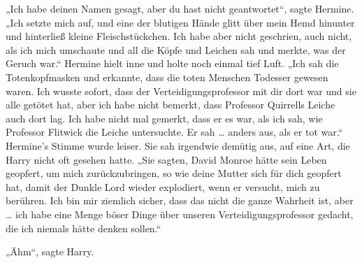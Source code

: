 „Ich habe deinen Namen gesagt, aber du hast nicht geantwortet“, sagte Hermine.
„Ich setzte mich auf, und eine der blutigen Hände glitt über mein Hemd hinunter und hinterließ kleine Fleischstückchen. Ich habe aber nicht geschrien, auch nicht, als ich mich umschaute und all die Köpfe und Leichen sah und merkte, was der Geruch war.“ Hermine hielt inne und holte noch einmal tief Luft.
„Ich sah die Totenkopfmasken und erkannte, dass die toten Menschen Todesser gewesen waren. Ich wusste sofort, dass der Verteidigungsprofessor mit dir dort war und sie alle getötet hat, aber ich habe nicht bemerkt, dass Professor Quirrells Leiche auch dort lag. Ich habe nicht mal gemerkt, dass er es war, als ich sah, wie Professor Flitwick die Leiche untersuchte. Er sah … anders aus, als er tot war.“
Hermine’s Stimme wurde leiser. Sie sah irgendwie demütig aus, auf eine Art, die Harry nicht oft gesehen hatte.
„Sie sagten, David Monroe hätte sein Leben geopfert, um mich zurückzubringen, so wie deine Mutter sich für dich geopfert hat, damit der Dunkle Lord wieder explodiert, wenn er versucht, mich zu berühren. Ich bin mir ziemlich sicher, dass das nicht die ganze Wahrheit ist, aber … ich habe eine Menge böser Dinge über unseren Verteidigungsprofessor gedacht, die ich niemals hätte denken sollen.“

„Ähm“, sagte Harry.

